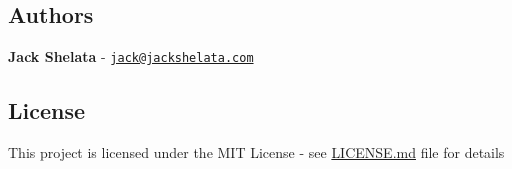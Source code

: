 \subsection*{Authors}


\begin{DoxyItemize}
\item {\bfseries Jack Shelata} -\/ \href{mailto:jack@jackshelata.com}{\tt jack@jackshelata.\+com}
\end{DoxyItemize}

\subsection*{License}

This project is licensed under the M\+IT License -\/ see \hyperlink{md_LICENSE}{L\+I\+C\+E\+N\+SE.md} file for details 